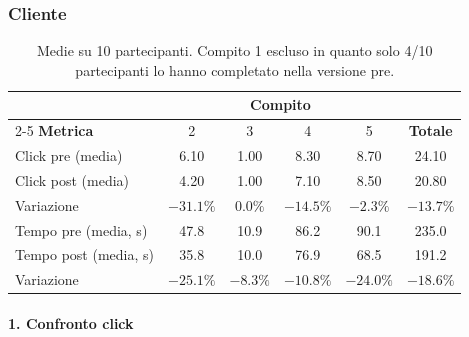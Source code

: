 \clearpage
\subsubsection{Cliente}
\begin{table}[h!]
    \centering
    \small
    \begin{tabular}{lccccc}
        \toprule
        & \multicolumn{4}{c}{\textbf{Compito}} & \\
        \cmidrule(lr){2-5}
        \textbf{Metrica} & 2 & 3 & 4 & 5 & \textbf{Totale} \\
        \midrule
        Click pre (media)   & 6.10 & 1.00 & 8.30 & 8.70 & 24.10 \\
        Click post (media)  & 4.20 & 1.00 & 7.10 & 8.50 & 20.80 \\
        Variazione          & $-31.1\%$ & $0.0\%$ & $-14.5\%$ & $-2.3\%$ & $-13.7\%$ \\
        \midrule
        Tempo pre (media, s)  & 47.8 & 10.9 & 86.2 & 90.1 & 235.0 \\
        Tempo post (media, s) & 35.8 & 10.0 & 76.9 & 68.5 & 191.2 \\
        Variazione            & $-25.1\%$ & $-8.3\%$ & $-10.8\%$ & $-24.0\%$ & $-18.6\%$ \\
        \bottomrule
    \end{tabular}
    \caption*{\small Medie su 10 partecipanti. Compito 1 escluso in quanto solo 4/10 partecipanti lo hanno completato nella versione pre.}
\end{table}

\paragraph{1. Confronto click}

